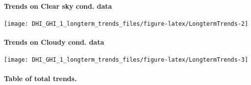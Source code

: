 \documentclass[
  10pt,
  a4paper,oneside]{article}
\begin{document}
\newpage

\hypertarget{trends-on-clear-sky-cond.-data}{%
\paragraph{Trends on Clear sky cond. data}\label{trends-on-clear-sky-cond.-data}}

\begin{center}\texttt{[image: DHI\_GHI\_1\_longterm\_trends\_files/figure-latex/LongtermTrends-2]} \end{center}

\newpage

\hypertarget{trends-on-cloudy-cond.-data}{%
\paragraph{Trends on Cloudy cond. data}\label{trends-on-cloudy-cond.-data}}

\begin{center}\texttt{[image: DHI\_GHI\_1\_longterm\_trends\_files/figure-latex/LongtermTrends-3]} \end{center}

\newpage

\hypertarget{table-of-total-trends.}{%
\paragraph{Table of total trends.}\label{table-of-total-trends.}}

\scriptsize
\end{document}
